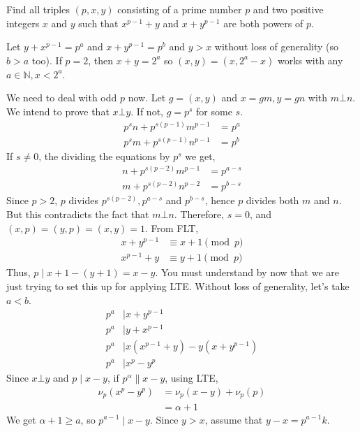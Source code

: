 \begin{problem}
	Find all triples $(p,x,y)$ consisting of a prime number $p$ and two positive integers $x$ and $y$ such that $x^{p-1}+y$ and $x+y^{p-1}$ are both powers of $p$.
\end{problem}

\begin{solution}
	Let $y+x^{p-1}=p^a$ and $x+y^{p-1}=p^b$ and $y>x$ without loss of generality (so $b>a$ too). If $p=2$, then $x+y=2^a$ so $(x,y)=(x,2^a-x)$ works with any $a\in\mathbb{N},x<2^a$.

	We need to deal with odd $p$ now. Let $g=(x,y)$ and $x=gm,y=gn$ with $m\bot n$. We intend to prove that $x\bot y$. If not, $g=p^s$ for some $s$.
		\begin{align*}
			p^sn+p^{s(p-1)}m^{p-1} & = p^a\\
			p^sm+p^{s(p-1)}n^{p-1} & = p^b
		\end{align*}
	If $s\neq0$, the dividing the equations by $p^s$ we get,
		\begin{align*}
			n+p^{s(p-2)}m^{p-1} & = p^{a-s}\\
			m+p^{s(p-2)}n^{p-2} & = p^{b-s}
		\end{align*}
	Since $p>2$, $p$ divides $p^{s(p-2)},p^{a-s}$ and $p^{b-s}$, hence $p$ divides both $m$ and $n$. But this contradicts the fact that $m\bot n$. Therefore, $s=0$, and $(x,p)=(y,p)=(x,y)=1$. From FLT,
		\begin{align*}
			x+y^{p-1}&\equiv x+1\pmod p\\
			x^{p-1}+y&\equiv y+1\pmod p
		\end{align*}
	Thus, $p\mid x+1-(y+1)=x-y$. You must understand by now that we are just trying to set this up for applying LTE. Without loss of generality, let's take $a<b$.
		\begin{align*}
			p^a& \mid x+y^{p-1}\\
			p^a& \mid y+x^{p-1}\\
			p^a& \mid x(x^{p-1}+y)-y(x+y^{p-1})\\
			p^a& \mid x^p-y^p
		\end{align*}
	Since $x\bot y$ and $p\mid x-y$, if $p^\alpha \|x-y$, using LTE,
		\begin{align*}
			\nu_p(x^p-y^p)  & = \nu_p(x-y)+\nu_p(p)\\
							& = \alpha +1
		\end{align*}
	We get $\alpha +1\geq a$, so $p^{a-1}\mid x-y$. Since $y>x$, assume that $y-x=p^{a-1}k$.

\end{solution}
